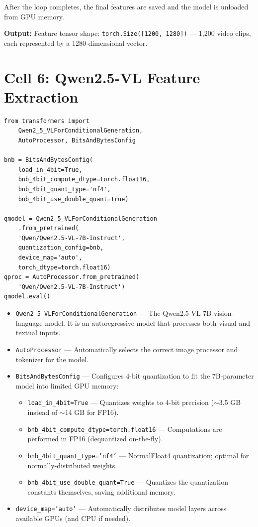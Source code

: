 After the loop completes, the final features are saved and the model is unloaded from GPU memory.

\textbf{Output:} Feature tensor shape: \texttt{torch.Size([1200, 1280])} --- 1,200 video clips, each represented by a 1280-dimensional vector.

\newpage
\section{Cell 6: Qwen2.5-VL Feature Extraction}

\begin{lstlisting}
from transformers import
    Qwen2_5_VLForConditionalGeneration,
    AutoProcessor, BitsAndBytesConfig

bnb = BitsAndBytesConfig(
    load_in_4bit=True,
    bnb_4bit_compute_dtype=torch.float16,
    bnb_4bit_quant_type='nf4',
    bnb_4bit_use_double_quant=True)

qmodel = Qwen2_5_VLForConditionalGeneration
    .from_pretrained(
    'Qwen/Qwen2.5-VL-7B-Instruct',
    quantization_config=bnb,
    device_map='auto',
    torch_dtype=torch.float16)
qproc = AutoProcessor.from_pretrained(
    'Qwen/Qwen2.5-VL-7B-Instruct')
qmodel.eval()
\end{lstlisting}

\begin{explanation}
\begin{itemize}[nosep]
  \item \texttt{Qwen2\_5\_VLForConditionalGeneration} --- The Qwen2.5-VL 7B vision-language model. It is an autoregressive model that processes both visual and textual inputs.
  \item \texttt{AutoProcessor} --- Automatically selects the correct image processor and tokenizer for the model.
  \item \texttt{BitsAndBytesConfig} --- Configures 4-bit quantization to fit the 7B-parameter model into limited GPU memory:
  \begin{itemize}[nosep]
    \item \texttt{load\_in\_4bit=True} --- Quantizes weights to 4-bit precision ($\sim$3.5 GB instead of $\sim$14 GB for FP16).
    \item \texttt{bnb\_4bit\_compute\_dtype=torch.float16} --- Computations are performed in FP16 (dequantized on-the-fly).
    \item \texttt{bnb\_4bit\_quant\_type='nf4'} --- NormalFloat4 quantization; optimal for normally-distributed weights.
    \item \texttt{bnb\_4bit\_use\_double\_quant=True} --- Quantizes the quantization constants themselves, saving additional memory.
  \end{itemize}
  \item \texttt{device\_map='auto'} --- Automatically distributes model layers across available GPUs (and CPU if needed).
\end{itemize}
\end{explanation}

